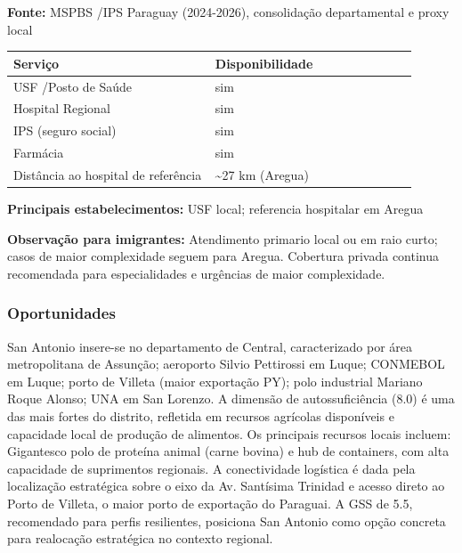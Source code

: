 \textbf{Fonte:} MSPBS /\allowbreak  IPS Paraguay (2024-2026), consolidação
departamental e proxy local

{\def\LTcaptype{none} %
\begin{longtable}{@{}>{\raggedright\arraybackslash}p{0.45\linewidth} >{\raggedright\arraybackslash}p{0.45\linewidth}@{}}
\toprule\noalign{}
Serviço & Disponibilidade \\
\midrule\noalign{}
\endhead
\bottomrule\noalign{}
\endlastfoot
USF /\allowbreak  Posto de Saúde & sim \\
Hospital Regional & sim \\
IPS (seguro social) & sim \\
Farmácia & sim \\
Distância ao hospital de referência & \textasciitilde27 km (Aregua) \\
\end{longtable}
}

\textbf{Principais estabelecimentos:} USF local; referencia hospitalar
em Aregua

\textbf{Observação para imigrantes:} Atendimento primario local ou em
raio curto; casos de maior complexidade seguem para Aregua. Cobertura
privada continua recomendada para especialidades e urgências de maior
complexidade.
\newpage

\subsubsection*{Oportunidades}\label{oport-san-antonio-1113}
San Antonio insere-se no departamento de Central, caracterizado por área metropolitana de Assunção; aeroporto Silvio Pettirossi em Luque; CONMEBOL em Luque; porto de Villeta (maior exportação PY); polo industrial Mariano Roque Alonso; UNA em San Lorenzo. A dimensão de autossuficiência (8.0) é uma das mais fortes do distrito, refletida em recursos agrícolas disponíveis e capacidade local de produção de alimentos. Os principais recursos locais incluem: Gigantesco polo de proteína animal (carne bovina) e hub de containers, com alta capacidade de suprimentos regionais. A conectividade logística é dada pela localização estratégica sobre o eixo da Av. Santísima Trinidad e acesso direto ao Porto de Villeta, o maior porto de exportação do Paraguai. A GSS de 5.5, recomendado para perfis resilientes, posiciona San Antonio como opção concreta para realocação estratégica no contexto regional.

